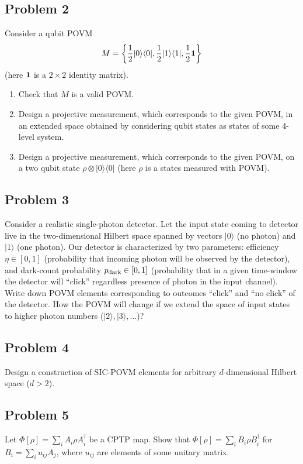\documentclass[a4paper,10pt]{article}
\newcommand{\ket}[1]{|#1\rangle}
\newcommand{\bra}[1]{\langle#1|}
\begin{document}
\subsection*{Problem 2}
Consider a qubit POVM
\begin{equation}
	M = \left\{\frac{1}{2}\ket{0}\bra{0}, \frac{1}{2}\ket{1}\bra{1}, \frac{1}{2}{\bf 1}\right\}
\end{equation}
(here ${\bf 1}$ is a $2\times 2$ identity matrix).
\begin{enumerate}
	\item Check that $M$ is a valid POVM.
	\item Design a projective measurement, which corresponds to the given POVM, in an extended space obtained by considering qubit states as states of some 4-level system. 
	\item Design a projective measurement, which corresponds to the given POVM, on a two qubit state $\rho\otimes\ket{0}\bra{0}$ (here $\rho$ is a states measured with POVM).
\end{enumerate}

\subsection*{Problem 3}
Consider a realistic single-photon detector.
Let the input state coming to detector live in the two-dimensional Hilbert space spanned by vectors $\ket{0}$ (no photon) and $\ket{1}$ (one photon).
Our detector is characterized by two parameters: efficiency $\eta\in [0,1]$ (probability that incoming photon will be observed by the detector), and dark-count probability $p_{\rm dark}\in[0,1]$ (probability that in a given time-window the detector will ``click'' regardless presence of photon in the input channel).
Write down POVM elements corresponding to outcomes ``click'' and ``no click'' of the detector.
How the POVM will change if we extend the space of input states to higher photon numbers ($\ket{2}, \ket{3}, \ldots$)?

\subsection*{Problem 4}
Design a construction of SIC-POVM elements for arbitrary $d$-dimensional Hilbert space ($d>2$).

\subsection*{Problem 5}
Let $\Phi[\rho]=\sum_{i}A_{i}\rho A_{i}^{\dagger}$ be a CPTP map.
Show that $\Phi[\rho]=\sum_{i}B_{i}\rho B_{i}^{\dagger}$ for $B_{i}=\sum_{i}u_{ij}A_{j}$, where $u_{ij}$ are elements of some unitary matrix.
\end{document}

